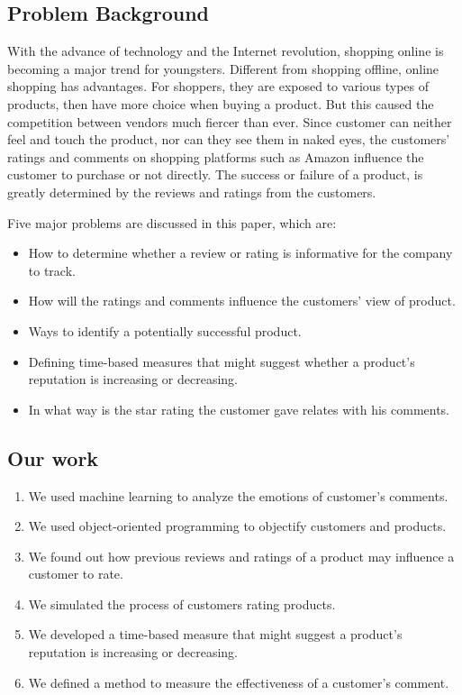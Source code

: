 \documentclass[12pt]{article}  %
\begin{document}
\subsection{Problem Background}
With the advance of technology and the Internet revolution, shopping online is becoming a major trend for youngsters. Different from shopping offline, online shopping has advantages. For shoppers, they are exposed to various types of products, then have more choice when buying a product. But this caused the competition between vendors much fiercer than ever. Since customer can neither feel and touch the product, nor can they see them in naked eyes, the customers' ratings and comments on shopping platforms such as Amazon influence the customer to purchase or not directly. The success or failure of a product, is greatly determined by the reviews and ratings from the customers.
\newline

\noindent
Five major problems are discussed in this paper, which are:
\begin{itemize}
    \item How to determine whether a review or rating is informative for the company to track.
    \item How will the ratings and comments influence the customers' view of product.
    \item Ways to identify a potentially successful product.
    \item Defining time-based measures that might suggest whether a product's reputation is increasing or decreasing.
    \item In what way is the star rating the customer gave relates with his comments.
      
      
\end{itemize}


\subsection{Our work}
\begin{enumerate}[\bfseries 1.]
    \item We used machine learning to analyze the emotions of customer's comments.
    \item We used object-oriented programming to objectify customers and products.
      \item We found out how previous reviews and ratings of a product may influence a customer to rate.
    \item We simulated the process of customers rating products.
    \item We developed a time-based measure that might suggest a product's reputation is increasing or decreasing.
      \item We defined a method to measure the effectiveness of a customer's comment.
\end{enumerate}
\end{document}
